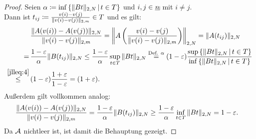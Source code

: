 \begin{proof}
Seien $\alpha\coloneqq  \inf\left\{\lVert Bt\rVert_{2,N}\,|\,t \in T\right\}$ und $i, j \in \haken n$
mit $i \neq j$.\\
Dann ist $t_{ij}\coloneqq  \frac{v(i)-v(j)}{\lVert v(i)-v(j)\rVert_{2,m}} \in T$ und es gilt:
\begin{align*}
&\,\frac{\lVert A(v(i)) - A(v(j))\rVert_{2,N}}{\lVert v(i)-v(j)\rVert_{2,m}}=
\left\|A\left(\frac{v(i)-v(j)}{\lVert v(i)-v(j)\rVert_{2,m}} \right)\right\|_{2, N}
= \lVert A(t_{ij})\rVert_{2, N}\\
=&\, \frac {1-\varepsilon}\alpha \lVert B(t_{ij})\rVert_{2,N}
\le \frac {1-\varepsilon}\alpha \sup_{t \in T}\,\lVert Bt\rVert_{2,N}
\overset{\text{Def. }\alpha}=(1-\varepsilon)
\frac{\sup\left\{\lVert Bt\rVert_{2,N}\,|\,t \in T\right\}}
           {\inf\left\{\lVert Bt\rVert_{2,N}\,|\,t \in T\right\}}\\
\overset{\eqref{jlleq:4}}\le&\, 
(1 - \varepsilon)\frac{1+\varepsilon}{1-\varepsilon} = (1+ \varepsilon)\text.
\end{align*}
Außerdem gilt vollkommen analog:
\begin{align*}
&\,\frac{\lVert A(v(i)) - A(v(j))\rVert_{2,N}}{\lVert v(i)-v(j)\rVert_{2,m}}=
\frac {1-\varepsilon}\alpha \lVert B(t_{ij})\rVert_{2,N}
\ge \frac {1-\varepsilon}\alpha \inf_{t \in T}\,\lVert Bt\rVert_{2,N}
= 1-\varepsilon\text.
\end{align*}
Da $\mathcal{A}$ nichtleer ist, ist damit die Behauptung gezeigt.
\end{proof}